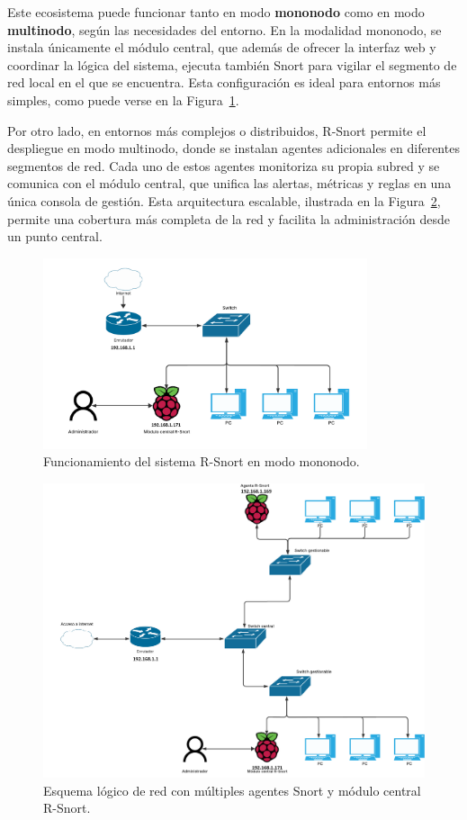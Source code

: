\documentclass[11pt,a4paper,twoside]{report}
\begin{document}
Este ecosistema puede funcionar tanto en modo \textbf{mononodo} como en modo \textbf{multinodo}, según las necesidades del entorno. En la modalidad mononodo, se instala únicamente el módulo central, que además de ofrecer la interfaz web y coordinar la lógica del sistema, ejecuta también Snort para vigilar el segmento de red local en el que se encuentra. Esta configuración es ideal para entornos más simples, como puede verse en la Figura~\ref{fig:esquema-mononodo}.\newline

Por otro lado, en entornos más complejos o distribuidos, R-Snort permite el despliegue en modo multinodo, donde se instalan agentes adicionales en diferentes segmentos de red. Cada uno de estos agentes monitoriza su propia subred y se comunica con el módulo central, que unifica las alertas, métricas y reglas en una única consola de gestión. Esta arquitectura escalable, ilustrada en la Figura~\ref{fig:esquema-red}, permite una cobertura más completa de la red y facilita la administración desde un punto central.

\begin{figure}[H]
	\centering
	\includegraphics[width=0.85\textwidth]{documento/4.png}
	\caption{Funcionamiento del sistema R-Snort en modo mononodo.}
	\label{fig:esquema-mononodo}
\end{figure}

\begin{figure}[H]
	\centering
	\includegraphics[width=1\textwidth]{documento/multinodo.png}
	\caption{Esquema lógico de red con múltiples agentes Snort y módulo central R-Snort.}
	\label{fig:esquema-red}
\end{figure}
\end{document}
